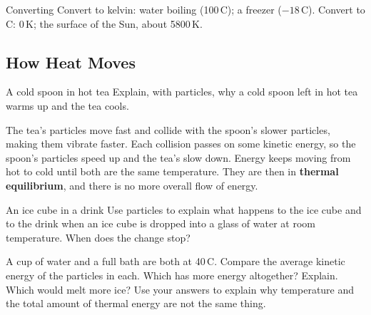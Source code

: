 \begin{wedo}{Converting}
Convert to kelvin: water boiling (100\,\textdegree C); a freezer ($-18$\,\textdegree C). Convert to \textdegree C: 0\,K; the surface of the Sun, about 5800\,K.
\workbox{4.5cm}
\end{wedo}

\subsection{How Heat Moves}\label{sub:a3.2}

\begin{workedex}{A cold spoon in hot tea}
Explain, with particles, why a cold spoon left in hot tea warms up and the tea cools.

\smallskip
The tea's particles move fast and collide with the spoon's slower particles, making them vibrate faster. Each collision passes on some kinetic energy, so the spoon's particles speed up and the tea's slow down. Energy keeps moving from hot to cold until both are the same temperature. They are then in \textbf{thermal equilibrium}, and there is no more overall flow of energy.
\end{workedex}

\begin{wedo}{An ice cube in a drink}
Use particles to explain what happens to the ice cube and to the drink when an ice cube is dropped into a glass of water at room temperature. When does the change stop?
\answerbox{5cm}
\end{wedo}

\label{prac:3}


\label{ext:3}

\task A cup of water and a full bath are both at 40\,\textdegree C.
 Compare the average kinetic energy of the particles in each.
\answerbox{3cm}
 Which has more energy altogether? Explain.
\answerbox{3cm}
 Which would melt more ice? Use your answers to explain why temperature and the total amount of thermal energy are not the same thing.
\answerbox{4cm}

\clearpage

\setcounter{section}{3}\renewcommand{\lessonart}{7}
\label{sec:4}

